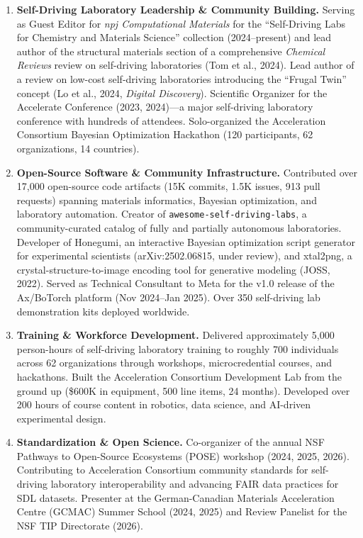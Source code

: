 \documentclass[11pt,letterpaper]{article}
\begin{document}
\begin{enumerate}

\item \textbf{Self-Driving Laboratory Leadership \& Community Building.}
Serving as Guest Editor for \textit{npj Computational Materials} for the
``Self-Driving Labs for Chemistry and Materials Science'' collection
(2024--present) and lead author of the structural materials section of a
comprehensive \textit{Chemical Reviews} review on self-driving laboratories
(Tom et al., 2024). Lead author of a review on low-cost self-driving
laboratories introducing the ``Frugal Twin'' concept (Lo et al., 2024,
\textit{Digital Discovery}). Scientific Organizer for the Accelerate
Conference (2023, 2024)---a major self-driving laboratory conference with
hundreds of attendees. Solo-organized the Acceleration Consortium
Bayesian Optimization Hackathon (120 participants, 62 organizations,
14 countries).

\item \textbf{Open-Source Software \& Community Infrastructure.}
Contributed over 17,000 open-source code artifacts (15K commits, 1.5K
issues, 913 pull requests) spanning materials informatics, Bayesian
optimization, and laboratory automation. Creator of
\texttt{awesome-self-driving-labs}, a community-curated catalog of fully and
partially autonomous laboratories. Developer of Honegumi, an
interactive Bayesian optimization script generator for experimental
scientists (arXiv:2502.06815, under review), and xtal2png, a crystal-structure-to-image encoding
tool for generative modeling (JOSS, 2022). Served as Technical Consultant to
Meta for the v1.0 release of the Ax/BoTorch platform (Nov 2024--Jan 2025).
Over 350 self-driving lab demonstration kits deployed worldwide.

\item \textbf{Training \& Workforce Development.}
Delivered approximately 5,000 person-hours of self-driving laboratory
training to roughly 700 individuals across 62 organizations through
workshops, microcredential courses, and hackathons. Built the Acceleration
Consortium Development Lab from the ground up (\$600K in equipment, 500 line
items, 24 months). Developed over 200 hours of course content in robotics,
data science, and AI-driven experimental design.

\item \textbf{Standardization \& Open Science.}
Co-organizer of the annual NSF Pathways to Open-Source Ecosystems (POSE)
workshop (2024, 2025, 2026). Contributing to
Acceleration Consortium community standards for
self-driving laboratory interoperability and advancing FAIR data practices
for SDL datasets. Presenter at the
German-Canadian Materials Acceleration Centre (GCMAC) Summer School (2024,
2025) and Review Panelist for the NSF TIP Directorate (2026).


\end{enumerate}
\end{document}
